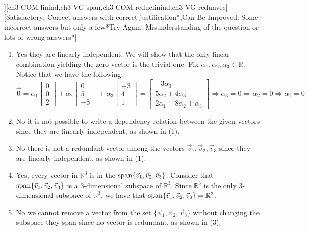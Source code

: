 \begin{SaveQuestion}
][ch3-COM-linind,ch3-VG-span,ch3-COM-reduclinind,ch3-VG-redunvec] %
    [Satisfactory: Correct answers with correct justification*,Can Be Improved: Some incorrect answers but only a few*Try Again: Misunderstanding of the question or lots of wrong answers*] 
    \begin{enumerate}
        \item Yes they are linearly independent. We will show that the only linear combination yielding the zero vector is the trivial one. Fix $\alpha_1, \alpha_2, \alpha_3 \in \mathbb{R}$. Notice that we have the following.
        $$\vec 0 = \alpha_1 \begin{bmatrix} 0 \\ 0 \\ 2 \end{bmatrix} + \alpha_2 \begin{bmatrix} 0 \\ 5 \\ -8 \end{bmatrix} + \alpha_3 \begin{bmatrix} -3 \\ 4 \\1 \end{bmatrix} = \begin{bmatrix} -3\alpha_3 \\ 5\alpha_2 + 4\alpha_3 \\ 2\alpha_1 - 8\alpha_2 + \alpha_3 \end{bmatrix} \Longrightarrow \alpha_3 = 0 \Longrightarrow \alpha_2 = 0 \Longrightarrow \alpha_1 = 0$$
        \item No it is not possible to write a dependency relation between the given vectors since they are linearly independent, as shown in (1). 
        \item No there is not a redundant vector among the vectors $\vec v_1, \vec v_2, \vec v_3$ since they are linearly independent, as shown in (1). 
        \item Yes, every vector in $\mathbb{R}^3$ is in the $\operatorname{span}\{\vec v_1, \vec v_2, \vec v_3\}$. Consider that $\operatorname{span}\{\vec v_1, \vec v_2, \vec v_3\}$ is a 3-dimensional subspace of $\mathbb{R}^3$. Since $\mathbb{R}^3$ is the only 3-dimensional subspace of $\mathbb{R}^3$, we have that $\operatorname{span}\{\vec v_1, \vec v_2, \vec v_3\} = \mathbb{R}^3$. 
        \item No we cannot remove a vector from the set $\{\vec v_1, \vec v_2, \vec v_3\}$ without changing the subspace they span since no vector is redundant, as shown in (3). 
    \end{enumerate}
\end{SaveQuestion}

